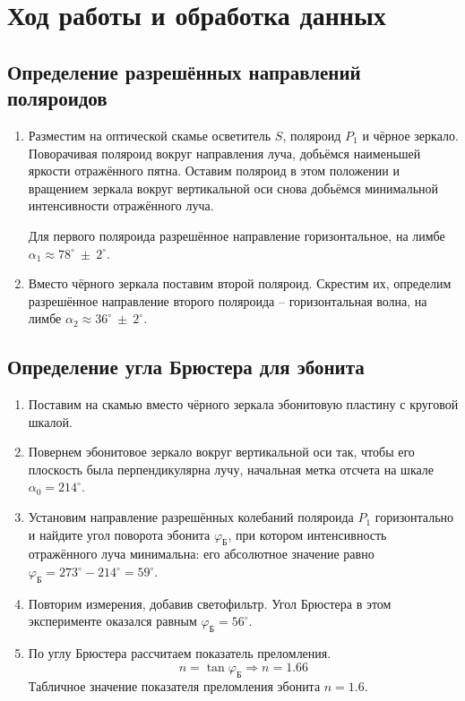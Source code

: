 


	
	
	\section*{Ход работы и обработка данных}
	
	\subsection*{Определение разрешённых направлений поляроидов}
	
	\begin{enumerate}
		\item Разместим на оптической скамье осветитель
		$S$, поляроид $P_1$ и чёрное зеркало. Поворачивая поляроид вокруг направления луча, добьёмся наименьшей яркости отражённого пятна. Оставим поляроид в этом положении и вращением зеркала вокруг вертикальной оси снова добьёмся минимальной интенсивности отражённого луча.
		
		Для первого поляроида разрешённое направление горизонтальное, на лимбе $\alpha_1 \approx 78^{\circ} ~ \pm ~ 2^{\circ}$.
		
		\item Вместо чёрного зеркала поставим второй поляроид. Скрестим их, определим разрешённое направление второго поляроида -- горизонтальная волна, на лимбе $\alpha_2 \approx 36^{\circ} ~ \pm ~ 2^{\circ}$.
	\end{enumerate}

	\subsection*{Определение угла Брюстера для эбонита}
	\begin{enumerate}
		\item Поставим на скамью вместо чёрного зеркала эбонитовую пластину с круговой шкалой.
		
		\item  Повернем эбонитовое зеркало вокруг вертикальной оси так, чтобы его
		плоскость была перпендикулярна лучу, начальная метка отсчета на шкале $\alpha_0 = 214^{\circ}$.
		
		\item Установим направление разрешённых колебаний поляроида $P_1$ горизонтально и найдите угол поворота эбонита $\varphi_{\text{Б}}$, при котором интенсивность отражённого луча минимальна: его абсолютное значение равно $\varphi_{\text{Б}} = 273^{\circ} - 214^{\circ} = 59^{\circ}$.
		
		\item Повторим измерения, добавив светофильтр. Угол Брюстера в этом эксперименте оказался равным $\varphi_{\text{Б}} = 56^{\circ}$.
		
		\item По углу Брюстера рассчитаем показатель преломления.
		\begin{equation}
			n = \tan \varphi_{\text{Б}} \Rightarrow n = 1.66
		\end{equation}
		Табличное значение показателя преломления эбонита $n = 1.6$.
		
	\end{enumerate}

